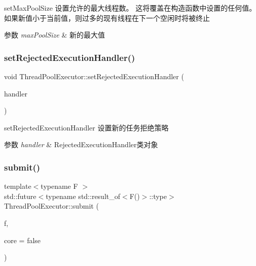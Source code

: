 set\+Max\+Pool\+Size 设置允许的最大线程数。 这将覆盖在构造函数中设置的任何值。 如果新值小于当前值，则过多的现有线程在下一个空闲时将被终止 


\begin{DoxyParams}{参数}
{\em max\+Pool\+Size} & 新的最大值 \\
\hline
\end{DoxyParams}
\mbox{\label{classThreadPoolExecutor_ab04e6a91b39073eaafffa8fc22eae325}} 
\subsubsection{\texorpdfstring{set\+Rejected\+Execution\+Handler()}{setRejectedExecutionHandler()}}
{\footnotesize\ttfamily void Thread\+Pool\+Executor\+::set\+Rejected\+Execution\+Handler (\begin{DoxyParamCaption}\item[{\hyperlink{classRejectedExecutionHandler}{Rejected\+Execution\+Handler}}]{handler }\end{DoxyParamCaption})}



set\+Rejected\+Execution\+Handler 设置新的任务拒绝策略 


\begin{DoxyParams}{参数}
{\em handler} & Rejected\+Execution\+Handler类对象 \\
\hline
\end{DoxyParams}
\mbox{\label{classThreadPoolExecutor_aaaef92fe45f7f5a8b659187c15881ca3}} 
\subsubsection{\texorpdfstring{submit()}{submit()}}
{\footnotesize\ttfamily template$<$typename F $>$ \\
std\+::future$<$typename std\+::result\+\_\+of$<$F()$>$\+::type$>$ Thread\+Pool\+Executor\+::submit (\begin{DoxyParamCaption}\item[{F}]{f,  }\item[{bool}]{core = {\ttfamily false} }\end{DoxyParamCaption})\hspace{0.3cm}{\ttfamily [inline]}}



